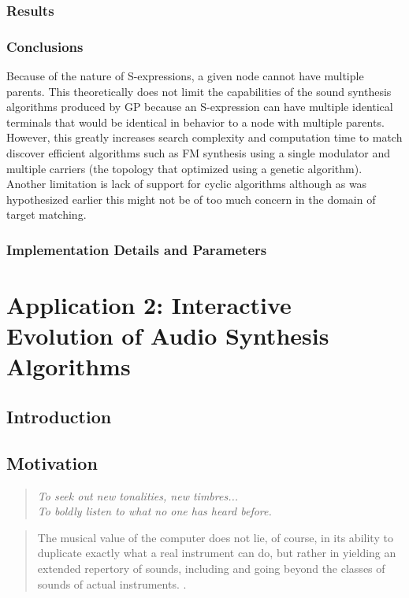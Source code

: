 \documentclass[12pt]{article}
\begin{document}
\subsubsection{Results}\label{TMRESULTS}
\subsubsection{Conclusions}\label{TMCONCLUSIONS}
Because of the nature of S-expressions, a given node cannot have multiple parents. This theoretically does not limit the capabilities of the sound synthesis algorithms produced by GP because an S-expression can have multiple identical terminals that would be identical in behavior to a node with multiple parents. However, this greatly increases search complexity and computation time to match discover efficient algorithms such as FM synthesis using a single modulator and multiple carriers (the topology that \citep{horner1993machine} optimized using a genetic algorithm). Another limitation is lack of support for cyclic algorithms although as was hypothesized earlier this might not be of too much concern in the domain of target matching.
\subsubsection{Implementation Details and Parameters}\label{TMIMPLEMENTATION}


\section{Application 2: Interactive Evolution of Audio Synthesis Algorithms}
\subsection{Introduction}\label{IGAINTRO}
\subsection{Motivation}\label{IGAMOTIVATION}
\begin{quote}
\emph{To seek out new tonalities, new timbres... \\
To boldly listen to what no one has heard before.} \citep{sethares2004tuning}
\end{quote}
\begin{quote}
The musical value of the computer does not lie, of course, in its ability to duplicate exactly what a real instrument can do, but rather in yielding an extended repertory of sounds, including and going beyond the classes of sounds of actual instruments. \citep{risset1969analysis}.
\end{quote}
\end{document}
